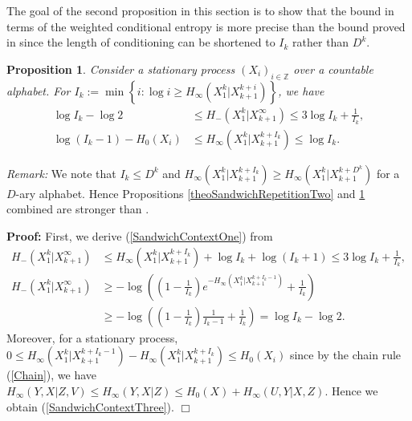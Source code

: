 \documentclass[a4paper,12pt]{article}
\newcommand{\okra}[1]{\left( #1 \right)}
\newcommand{\klam}[1]{\left\{ #1 \right\}}
\newtheorem{proposition}{Proposition}
\newenvironment*{proof}{\begin{trivlist}\item[]
\noindent\textbf{Proof:}}{$\Box$\par\end{trivlist}}
\begin{document}
The goal of the second proposition in this section is to show that the
bound in terms of the weighted conditional entropy is more precise
than the bound proved in \cite[Theorem 8]{Debowski18b} since the
length of conditioning can be shortened to $I_k$ rather than $D^k$.
\begin{proposition}
  \label{theoSandwichContext}
  Consider a stationary process $(X_i)_{i\in\mathbb{Z}}$ over a
  countable alphabet.  For
  $I_k:=\min\klam{i:\log i\ge H_\infty(X_1^k|X_{k+1}^{k+i})}$, we have
\begin{align}
  \label{SandwichContextOne}
  \log I_k-\log 2&\le H_-(X_1^k|X_{k+1}^\infty)\le
  3\log I_k+\frac{1}{I_k}
  ,
  \\
  \label{SandwichContextThree}
  \log (I_k-1)-H_0(X_i)&\le H_\infty(X_1^k|X_{k+1}^{k+I_k})\le \log I_k
                              .
\end{align}
\end{proposition}
\noindent
\emph{Remark:} We note that $I_k\le D^k$ and
$H_\infty(X_1^k|X_{k+1}^{k+I_k})\ge H_\infty(X_1^k|X_{k+1}^{k+D^k})$
for a $D$-ary alphabet. Hence Propositions
\ref{theoSandwichRepetitionTwo} and \ref{theoSandwichContext} combined
are stronger than \cite[Theorem 8]{Debowski18b}.
\begin{proof}
First, we derive (\ref{SandwichContextOne}) from
\begin{align}
  H_-(X_1^k|X_{k+1}^\infty)
  &\le
    H_\infty(X_1^k|X_{k+1}^{k+I_k})+\log I_k+\log (I_k+1)\le
    3\log I_k+\frac{1}{I_k},
  \\
  H_-(X_1^k|X_{k+1}^\infty)
  &\ge
    -\log\okra{\okra{1-\frac{1}{I_k}}e^{-H_\infty(X_1^k|X_{k+1}^{k+I_k-1})}
    +\frac{1}{I_k}}
    \nonumber\\
  &\ge -\log\okra{\okra{1-\frac{1}{I_k}}\frac{1}{I_k-1}+\frac{1}{I_k}}
    =\log I_k-\log 2.
\end{align}
Moreover, for a stationary process,
$0 \le
H_\infty(X_1^k|X_{k+1}^{k+I_k-1})-H_\infty(X_1^k|X_{k+1}^{k+I_k})\le
H_0(X_i)$
since by the chain rule (\ref{Chain}), we have
  $H_\infty(Y,X|Z,V)\le H_\infty(Y,X|Z)
  \le H_0(X)+H_\infty(U,Y|X,Z)$. 
Hence we obtain (\ref{SandwichContextThree}).
\end{proof}
\end{document}
